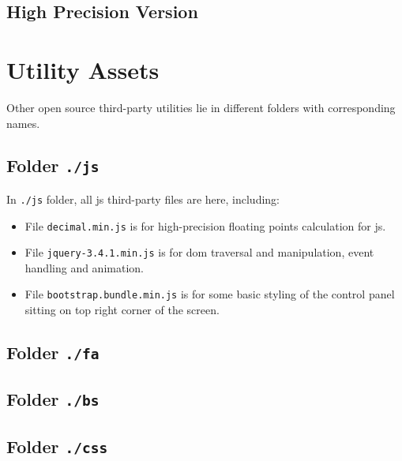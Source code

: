 \subsection{High Precision Version}


\section{Utility Assets}

Other open source third-party utilities lie in different folders with corresponding names.

\subsection{Folder \texttt{./js}}

In \texttt{./js} folder, all \gls{js} third-party files are here, including:

\begin{itemize}
    \item File \texttt{decimal.min.js} is for high-precision floating points calculation for \acrfull{js}.
    \item File \texttt{jquery-3.4.1.min.js} is for \gls{dom} traversal and manipulation, event handling and animation.
    \item File \texttt{bootstrap.bundle.min.js} is for some basic styling of the control panel sitting on top right corner of the screen.
\end{itemize}

\subsection{Folder \texttt{./fa}}

\subsection{Folder \texttt{./bs}}

\subsection{Folder \texttt{./css}}